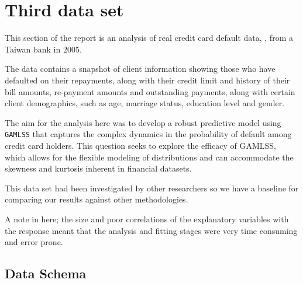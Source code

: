 \section{Third data set}

This section of the report is an analysis of real credit card default data,  \cite{Cheng:2026},
from a Taiwan bank in 2005.

The data contains a snapshot of client information showing those who have defaulted on their repayments, along with their
credit limit and history of their bill amounts, re-payment amounts and outstanding payments, along with certain client demographics, such
as age, marriage status, education level and gender.

The aim for the analysis here was to develop a robust predictive model using \texttt{GAMLSS} that captures the complex dynamics in the
probability of default among credit card holders.  This question seeks to explore the efficacy of GAMLSS, which allows for the
flexible modeling of distributions and can accommodate the skewness and kurtosis inherent in financial datasets. 

This data set had been investigated by other researchers \cite{Yeh:2009} so we have a baseline for comparing our results against other
methodologies.

A note in here; the size and poor correlations of the explanatory variables with the response meant that the analysis and
fitting stages were very time consuming and error prone.  

\subsection{Data Schema}

